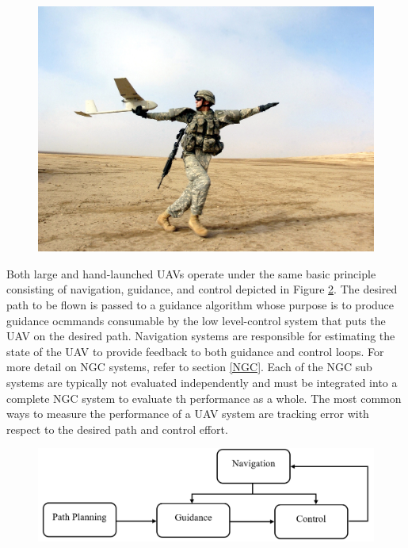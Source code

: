 \documentclass[numbered,pdftex]{ohio-etd}
\begin{document}
\begin{figure}[h]
	\centering
	\includegraphics[width=0.5\linewidth]{PaperFigures/handlaunched}
	\caption{}
	\label{fig:handlaunched}
\end{figure}

Both large and hand-launched UAVs operate under the same basic principle consisting of navigation, guidance, and control depicted in Figure \ref{fig:ngcflow}. The desired path to be flown is passed to a guidance algorithm whose purpose is to produce guidance ocmmands consumable by the low level-control system that puts the UAV on the desired path. Navigation systems are responsible for estimating the state of the UAV to provide feedback to both guidance and control loops. For more detail on NGC systems, refer to section \ref{NGC}. Each of the NGC sub systems are typically not evaluated independently and must be integrated into a complete NGC system to evaluate th performance as a whole. The most common ways to measure the performance of a UAV system are tracking error with respect to the desired path and control effort.

\begin{figure}[]
	\centering
	\includegraphics[width=0.7\linewidth]{PaperFigures/ngcFlow}
	\caption{}
	\label{fig:ngcflow}
\end{figure}
\end{document}
